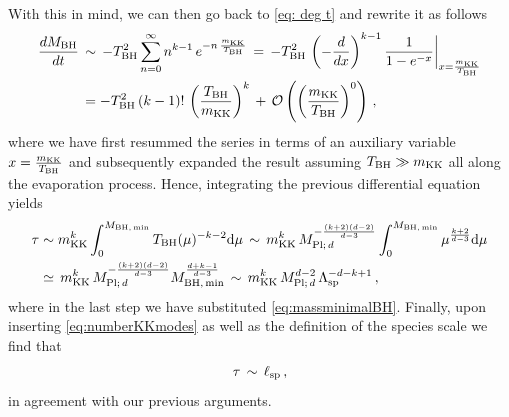 %
With this in mind, we can then go back to \eqref{eq: deg t} and rewrite it as follows
%
\begin{align}
     \frac{d M_{\rm BH}}{d t}\, &\sim\, -T_{\rm BH}^2\sum_{n=0}^{\infty}n^{k-1}\, e^{-n\, \frac{m_{\text{KK}}}{T_{\rm BH}}}\, =\, -T_{\rm BH}^2\, \left( -\frac{d}{dx}\right)^{k-1} \frac{1}{1-e^{-x}}\bigg\rvert_{x=\frac{m_{\text{KK}}}{T_{\rm BH}}} \notag\\
     &=-T_{\rm BH}^2\, (k-1)!\,  \left(\frac{T_{\rm BH}}{m_{\text{KK}}}\right)^k\, +\, \mathcal{O} \left( \left(\frac{m_{\text{KK}}}{T_{\rm BH}}\right)^0 \right)\, ,
\end{align}
%
where we have first resummed the series in terms of an auxiliary variable $x=\frac{m_{\text{KK}}}{T_{\rm BH}}$ and subsequently expanded the result assuming $T_{\rm BH} \gg m_{\text{KK}}$ all along the evaporation process. Hence, integrating the previous differential equation yields 
%
\begin{align}\label{eq: tau int}
    \tau&\sim m_{\text{KK}}^k\int_0^{M_{\rm BH,\, min}}T_{\rm BH}(\mu)^{-k-2}{\rm d} \mu\, \sim\, m_{\text{KK}}^k\, M_{{\rm Pl;}\, d}^{-\frac{(k+2)(d-2)}{d-3}}\int_0^{M_{\rm BH,\, min}}\mu^{\frac{k+2}{d-3}}{\rm d} \mu\notag\\
    &\simeq\, m_{\text{KK}}^k\, M_{{\rm Pl;}\, d}^{-\frac{(k+2)(d-2)}{d-3}} M_{\rm BH,\, min}^{\frac{d+k-1}{d-3}}\, \sim\, m_{\text{KK}}^k\, M_{{\rm Pl;}\, d}^{d-2}\, \Lambda_{\text{sp}}^{-d-k+1}\,,
\end{align}
%
where in the last step we have substituted \eqref{eq:massminimalBH}. Finally, upon inserting \eqref{eq:numberKKmodes} as well as the definition of the species scale we find that
%
\begin{equation}
    \tau\, \sim\, \ell_{\rm sp}\, ,
\end{equation}
%
in agreement with our previous arguments.
	
	
